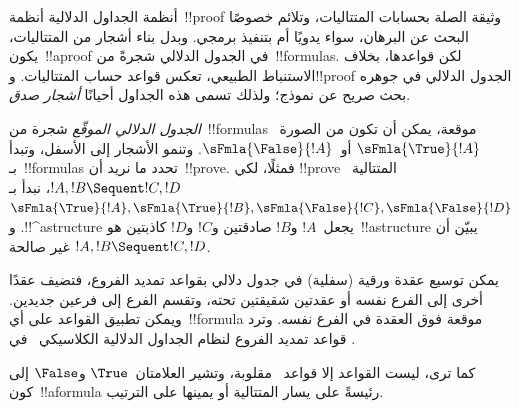 \documentclass[../../../include/open-logic-section]{subfiles}
\begin{document}


أنظمة الجداول الدلالية أنظمة~!!{proof} وثيقة الصلة بحسابات المتتاليات، وتلائم
خصوصًا البحث عن البرهان، سواء يدويًا أم بتنفيذ برمجي. وبدل بناء أشجار من
المتتاليات، يكون~!!a{proof} في الجدول الدلالي شجرةً من~!!{formula}s. لكن
قواعدها، بخلاف الاستنباط الطبيعي، تعكس قواعد حساب المتتاليات. و!!{proof}
الجدول الدلالي في جوهره بحث صريح عن نموذج؛ ولذلك تسمى هذه الجداول أحيانًا
\emph{أشجار صدق}.

\emph{الجدول الدلالي الموقّع} شجرة من~!!{formula}s موقعة، يمكن أن تكون من
الصورة~$\sFmla{\True}{!A}$ أو~$\sFmla{\False}{!A}$. وتنمو الأشجار إلى
الأسفل، وتبدأ بـ~!!{formula}s تحدد ما نريد أن~!!{prove}. فمثلًا، لكي
!!{prove} المتتالية~$!A,!B\Sequent !C,!D$، نبدأ بـ
$\sFmla{\True}{!A},\sFmla{\True}{!B},
\sFmla{\False}{!C},\sFmla{\False}{!D}$. و!!^a{structure} يجعل~$!A$ و$!B$
صادقتين و$!C$ و$!D$ كاذبتين هو~!!a{structure} يبيّن أن
$!A,!B\Sequent !C,!D$ غير صالحة.

يمكن توسيع عقدة ورقية (سفلية) في جدول دلالي بقواعد تمديد الفروع، فتضيف
عقدًا أخرى إلى الفرع نفسه أو عقدتين شقيقتين تحته، وتقسم الفرع إلى فرعين
جديدين. ويمكن تطبيق القواعد على أي~!!{formula} موقعة فوق العقدة في الفرع
نفسه. وترد قواعد تمديد الفروع لنظام الجداول الدلالية الكلاسيكي~ في
.



كما ترى، ليست القواعد إلا قواعد~ مقلوبة، وتشير العلامتان~$\True$
و$\False$ إلى كون~!!a{formula} رئيسةً على يسار المتتالية أو يمينها على
الترتيب.
\end{document}
